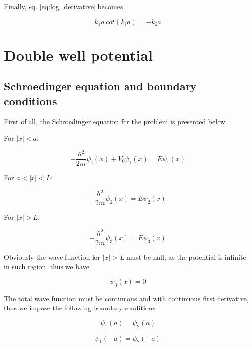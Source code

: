 \documentclass{article}
\begin{document}
Finally, eq. \eqref{eq:log_derivative} becomes

\begin{equation}
k_1a \, cot(k_1a) = -k_2a
\end{equation}

\section{Double well potential}

\subsection{Schroedinger equation and boundary conditions}
First of all, the Schroedinger equation for the problem is presented below.

For \(\left|x\right| < a\):

\begin{equation}
\label{eq:schr1}
-\frac{\hbar^2}{2m}\psi_{1}(x) + V_{0}\psi_{1}(x) = E\psi_{1}(x)
\end{equation}

For \(a < \left|x\right| < L\):

\begin{equation}
\label{eq:schr2}
-\frac{\hbar^2}{2m}\psi_{2}(x) = E\psi_{2}(x)
\end{equation}

For \(\left|x\right| > L\):

\begin{equation}
\label{eq:schr3}
-\frac{\hbar^2}{2m}\psi_{3}(x) = E\psi_{3}(x)
\end{equation}

Obviously the wave function for \(\left|x\right| > L\) must be null, as the potential is infinite in such region, thus we have

\begin{equation}
\psi_{3}(x) = 0
\end{equation}

The total wave function must be continuous and with continuous first derivative, thus we impose the following boundary conditions

\begin{equation}
\label{eq:continuity}
\psi_{1}(a) =  \psi_{2}(a)
\end{equation}

\begin{equation}
\psi_{1}(-a) =  \psi_{2}(-a)
\end{equation}
\end{document}
